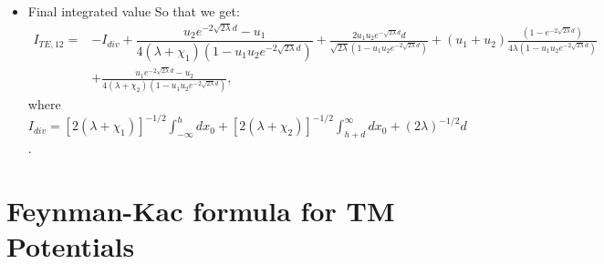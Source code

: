 \begin{itemize}
    \item Final integrated value
    So that we get:
    \begin{align}
      I_{TE,12} =& -I_{div} + \dfrac{u_2 e^{-2\sqrt{2\lambda}d}-u_1}{4(\lambda+\chi_1)(1-u_1u_2 e^{-2\sqrt{2\lambda}d})} +\frac{2u_1u_2 e^{-\sqrt{2\lambda}d}d}{\sqrt{2\lambda}(1-u_1u_2 e^{-2\sqrt{2\lambda}d})} + (u_1+u_2)\frac{(1-e^{-2\sqrt{2\lambda}d})}{4\lambda(1-u_1u_2e^{-2\sqrt{2\lambda}d})}\nonumber\\
      & +\frac{u_1 e^{-2\sqrt{2\lambda}d} - u_2}{4(\lambda+\chi_2)(1-u_1u_2 e^{-2\sqrt{2\lambda}d})},
    \end{align}
    where $I_{div} = [2(\lambda+\chi_1)]^{-1/2}\int_{-\infty}^h dx_0  +  [2(\lambda+\chi_2)]^{-1/2}\int_{h+d}^\infty dx_0  + (2\lambda)^{-1/2}d$.
    

\end{itemize}

\section{Feynman-Kac formula for TM Potentials}

